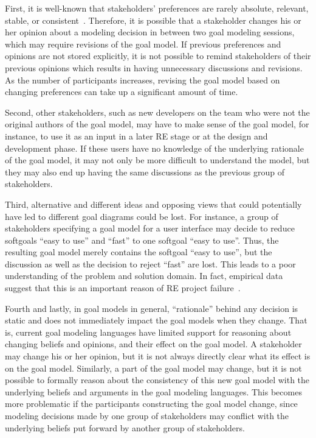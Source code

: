 First, it is well-known that stakeholders' preferences are rarely absolute, relevant, stable, or consistent~\cite{march1978bounded}. Therefore, it is possible that a stakeholder changes his or her opinion about a modeling decision in between two goal modeling sessions, which may require revisions of the goal model. If previous preferences and opinions are not stored explicitly, it is not possible to remind stakeholders of their previous opinions which results in having unnecessary discussions and revisions. As the number of participants increases, revising the goal model based on changing preferences can take up a significant amount of time. 

Second, other stakeholders, such as new developers on the team who were not the original authors of the goal model, may have to make sense of the goal model, for instance, to use it as an input in a later RE stage or at the design and development phase. If these users have no knowledge of the underlying rationale of the goal model, it may not only be more difficult to understand the model, but they may also end up having the same discussions as the previous group of stakeholders.

Third, alternative and different ideas and opposing views that could potentially have led to different goal diagrams could be lost. For instance, a group of stakeholders specifying a goal model for a user interface may decide to reduce softgoals ``easy to use'' and ``fast'' to one softgoal ``easy to use''. Thus, the resulting goal model merely contains the softgoal ``easy to use'', but the discussion as well as the decision to reject ``fast'' are lost. This leads to a poor understanding of the problem and solution domain. In fact, empirical data suggest that this is an important reason of RE project failure~\cite{curtis1988field}. 

Fourth and lastly, in goal models in general, ``rationale'' behind any decision is static and does not immediately impact the goal models when they change. That is, current goal modeling languages have limited support for reasoning about changing beliefs and opinions, and their effect on the goal model. A stakeholder may change his or her opinion, but it is not always directly clear what its effect is on the goal model. Similarly, a part of the goal model may change, but it is not possible to formally reason about the consistency of this new goal model with the underlying beliefs and arguments in the goal modeling languages. This becomes more problematic if the participants constructing the goal model change, since modeling decisions made by one group of stakeholders may conflict with the underlying beliefs put forward by another group of stakeholders.

